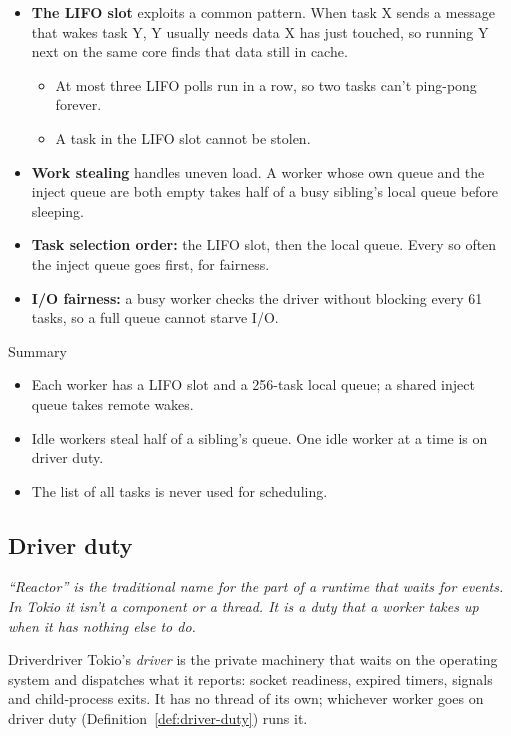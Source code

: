 \begin{itemize}
    \item \textbf{The LIFO slot} exploits a common pattern. When task X sends a message that wakes task Y, Y usually needs data X has just touched, so running Y next on the same core finds that data still in cache.
    \begin{itemize}
        \item At most three LIFO polls run in a row, so two tasks can't ping-pong forever.
        \item A task in the LIFO slot cannot be stolen.
    \end{itemize}
    \item \textbf{Work stealing} handles uneven load. A worker whose own queue and the inject queue are both empty takes half of a busy sibling's local queue before sleeping.
    \item \textbf{Task selection order:} the LIFO slot, then the local queue. Every so often the inject queue goes first, for fairness.
    \item \textbf{I/O fairness:} a busy worker checks the driver without blocking every 61 tasks, so a full queue cannot starve I/O.
\end{itemize}

\begin{quotebox}{Summary}
    \begin{itemize}
        \item Each worker has a LIFO slot and a 256-task local queue; a shared inject queue takes remote wakes.
        \item Idle workers steal half of a sibling's queue. One idle worker at a time is on driver duty.
        \item The list of all tasks is never used for scheduling.
    \end{itemize}
\end{quotebox}

\subsection{Driver duty}
\label{sec:wakers-ch11}

\textit{``Reactor'' is the traditional name for the part of a runtime that waits for events. In Tokio it isn't a component or a thread. It is a duty that a worker takes up when it has nothing else to do.}

\begin{definition}{Driver}{driver}
    Tokio's \emph{driver} is the private machinery that waits on the operating system and dispatches what it reports: socket readiness, expired timers, signals and child-process exits. It has no thread of its own; whichever worker goes on driver duty (Definition~\ref{def:driver-duty}) runs it.
\end{definition}

